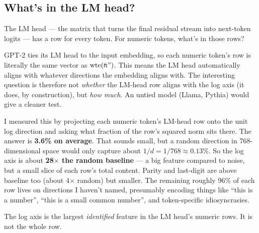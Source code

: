 \documentclass[
]{article}
\begin{document}
\subsection{What's in the LM head?}\label{sec-lm-head}

The LM head --- the matrix that turns the final residual stream into
next-token logits --- has a row for every token. For numeric tokens,
what's in those rows?

\begin{tcolorbox}[enhanced jigsaw, arc=.35mm, bottomrule=.15mm, bottomtitle=1mm, breakable, colback=white, colbacktitle=quarto-callout-warning-color!10!white, colframe=quarto-callout-warning-color-frame, coltitle=black, left=2mm, leftrule=.75mm, opacityback=0, opacitybacktitle=0.6, rightrule=.15mm, title=\textcolor{quarto-callout-warning-color}{\faExclamationTriangle}\hspace{0.5em}{Architectural caveat}, titlerule=0mm, toprule=.15mm, toptitle=1mm]

GPT-2 ties its LM head to the input embedding, so each numeric token's
row is literally the same vector as \(\mathrm{wte}(``\!\!\!\!\!~n")\).
This means the LM head automatically aligns with whatever directions the
embedding aligns with. The interesting question is therefore not
\emph{whether} the LM-head row aligns with the log axis (it does, by
construction), but \emph{how much}. An untied model (Llama, Pythia)
would give a cleaner test.

\end{tcolorbox}

I measured this by projecting each numeric token's LM-head row onto the
unit log direction and asking what fraction of the row's squared norm
sits there. The answer is \textbf{3.6\% on average}. That sounds small,
but a random direction in 768-dimensional space would only capture about
\(1/d = 1/768 \approx 0.13\%\). So the log axis is about
\textbf{28\(\times\) the random baseline} --- a big feature compared to
noise, but a small slice of each row's total content. Parity and
last-digit are above baseline too (about 4\(\times\) random) but
smaller. The remaining roughly 96\% of each row lives on directions I
haven't named, presumably encoding things like ``this is a number'',
``this is a small common number'', and token-specific idiosyncrasies.

The log axis is the largest \emph{identified} feature in the LM head's
numeric rows. It is not the whole row.
\end{document}

